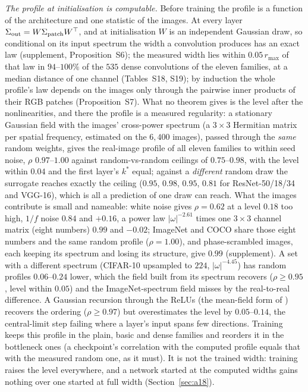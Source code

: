 \documentclass[10pt,journal,compsoc]{IEEEtran}
\begin{document}
\emph{The profile at initialisation is computable.} Before training the
profile is a function of the architecture and one statistic of the images.
At every layer $\Sigma_{\rm out} = W\Sigma_{\rm patch}W^{\top}$, and at
initialisation $W$ is an independent Gaussian draw, so conditional on its
input spectrum the width a convolution produces has an exact law
(supplement, Proposition~S6); the measured width lies within $0.05\,r_{\max}$
of that law in $94$--$100\%$ of the $535$ dense convolutions of the eleven
families, at a median distance of one channel (Tables~S18, S19); by
induction the whole profile's law depends on the images only through the
pairwise inner products of their RGB patches (Proposition~S7). What no
theorem gives is the level after the nonlinearities, and there the
profile is a measured regularity: a stationary Gaussian field with the images' cross-power
spectrum (a $3 \times 3$ Hermitian matrix per spatial frequency, estimated on
the $6{,}400$ images), passed through the \emph{same} random weights, gives
the real-image profile of all eleven families to within seed noise, $\rho$
$0.97$--$1.00$ against random-vs-random ceilings of $0.75$--$0.98$, with the
level within $0.04$ and the first layer's $k^*$ equal; against a
\emph{different} random draw the surrogate reaches exactly the ceiling
($0.95$, $0.98$, $0.95$, $0.81$ for ResNet-50/18/34 and VGG-16), which is all
a prediction of one draw can reach. What the images contribute is small
and nameable: white noise gives $\rho = 0.62$ at a level $0.18$ too high,
$1/f$ noise $0.84$ and $+0.16$, a power law $|\omega|^{-2.61}$ times one
$3 \times 3$ channel matrix (eight numbers) $0.99$ and $-0.02$; ImageNet
and COCO share those eight numbers and the same random profile
($\rho = 1.00$), and phase-scrambled images, each keeping its spectrum
and losing its structure, give $0.99$ (supplement). A set with a different spectrum (CIFAR-10 upsampled to $224$,
$|\omega|^{-4.45}$) has random profiles $0.06$--$0.24$ lower, which the
field built from its spectrum recovers ($\rho \ge 0.95$, level within
$0.05$) and the ImageNet-spectrum field misses by the real-to-real
difference. A Gaussian
recursion through the ReLUs (the mean-field form of
\cite{poole2016exponential,xiao2018dynamical}) recovers the ordering
($\rho \ge 0.97$) but overestimates the level by $0.05$--$0.14$, the
central-limit step failing where a layer's input spans few directions. Training keeps this profile in the plain, basic and dense families and
reorders it in the bottleneck ones (a checkpoint's correlation with the
computed profile equals that with the measured random one, as it must).
It is not the trained width: training raises the level everywhere, and a
network started at the computed widths gains nothing over one started at
full width (Section~\ref{sec:a18}).
\end{document}
